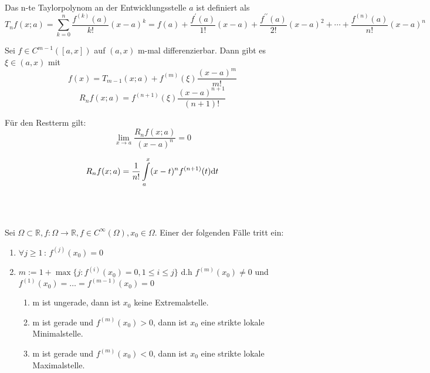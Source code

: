 	\\[1em]
		\begin{definition}[Taylorpolynom]
			Das n-te Taylorpolynom an der Entwicklungsstelle $a$ ist definiert als
			$$ T_n f(x;a) = \sum\limits_{k = 0}^{n} \frac{f^{(k)}(a)}{k!}(x-a)^k = f(a) + \frac{f^\prime(a)}{1!}(x-a) + \frac{f^{\prime\prime}(a)}{2!}(x-a)^2 + \cdots + \frac{f^{(n)}(a)}{n!} (x- a)^n $$
		\end{definition}
		\begin{definition}
			Sei $f \in C^{m-1}([a,x])$ auf $(a,x)$ m-mal differenzierbar. Dann gibt es $\xi \in (a,x)$ mit
			$$ f(x) = T_{m-1}(x;a) + f^{(m)}(\xi)\frac{(x-a)^m}{m!} $$
			$$ R_n f(x;a) = f^{(n+1)}(\xi)\frac{(x-a)^{n+1}}{(n+1)!} $$
		\end{definition}
		\begin{proofhelp}[Restterm]
			Für den Restterm gilt:
			$$ \lim\limits_{x \to a} \frac{R_n f(x;a)}{(x-a)^n} = 0 $$
		\end{proofhelp}
		\begin{proofhelp}
			$$R_n f(x;a) = \frac{1}{n!}\int\limits_{a}^{x}(x-t)^n f^{(n+1)}(t) \mathrm{d} t$$
		\end{proofhelp}
	\\[1em]
		\begin{theorem}[Extremalstellen]
			\hfill\\
			Sei $\Omega \subset \mathbb{R}, f: \Omega \to \mathbb{R}, f \in C^{\infty}(\Omega), x_0 \in \Omega$. Einer der folgenden Fälle tritt ein:
			\begin{enumerate}
				\item $\forall j \geq 1 \, : \, f^{(j)}(x_0) = 0$
				\item $m := 1 + \max \{ j : f^{(i)}(x_0) = 0, 1 \leq i \leq j \}$ d.h $f^{(m)}(x_0) \neq 0$ und $f^{(1)}(x_0) = \dots = f^{(m - 1)}(x_0) = 0$
				\begin{enumerate}
					\item m ist ungerade, dann ist $x_0$ keine Extremalstelle.
					\item m ist gerade und $f^{(m)}(x_0) > 0$, dann ist $x_0$ eine strikte lokale Minimalstelle.
					\item m ist gerade und $f^{(m)}(x_0) < 0$, dann ist $x_0$ eine strikte lokale Maximalstelle.
				\end{enumerate}
			\end{enumerate}
		\end{theorem}